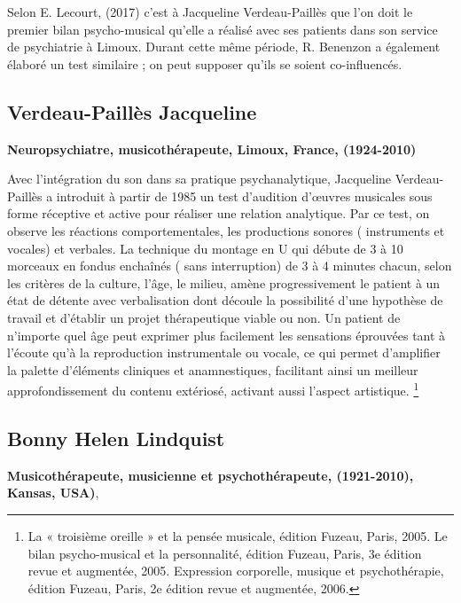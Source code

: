         Selon E. Lecourt,
(2017)\autocite[ch.~3, p.~84]{Les arts-thérapies,Ed.Armand-Colin}
c'est à Jacqueline Verdeau-Paillès que l'on doit le premier bilan
psycho-musical qu'elle a réalisé avec ses patients dans son service
de psychiatrie à Limoux. Durant cette même période, R.
Benenzon a également élaboré un test similaire \autocite{benenzon:musicotherapie}; on peut supposer qu'ils se soient co-influencés. 


	


\subsection{Verdeau-Paillès Jacqueline
}
\textbf{Neuropsychiatre,
  musicothérapeute, Limoux, France, (1924-2010)}

Avec l'intégration du son dans sa pratique psychanalytique, 
Jacqueline Verdeau-Paillès a introduit  à partir de 1985  un test d'audition d'\oe uvres musicales
sous forme réceptive et active pour réaliser
une relation analytique\autocite{verdeau-pailles:bilan}.
Par ce test, on
observe les réactions comportementales, les productions sonores (
instruments et vocales) et verbales. La technique du montage en U qui débute de 3 à 10
morceaux en fondus enchaînés ( sans interruption) de 3 à 4 minutes chacun, selon les
critères de la culture, l'âge, le milieu,
amène progressivement le patient à un état de détente
avec verbalisation dont découle la possibilité 
d'une hypothèse de
travail et d'établir un projet thérapeutique viable ou non.
Un patient de n'importe quel âge peut exprimer plus facilement les
sensations éprouvées tant à l'écoute qu'à la reproduction
instrumentale ou vocale, ce qui permet d'amplifier la palette d'éléments
cliniques et anamnestiques, facilitant ainsi un meilleur approfondissement du
contenu extériosé, activant aussi l'aspect artistique.
\footnote{ La « troisième oreille » et la pensée musicale, édition Fuzeau, Paris, 2005.
Le bilan psycho-musical et la personnalité, édition Fuzeau, Paris, 3e édition revue et augmentée, 2005.
Expression corporelle, musique et psychothérapie, édition Fuzeau,
Paris, 2e édition revue et augmentée, 2006.} 



\subsection{Bonny Helen Lindquist} 

\textbf{ Musicothérapeute,
  musicienne et psychothérapeute, (1921-2010), Kansas, USA)},

